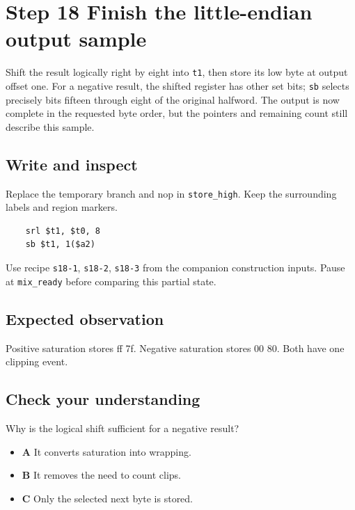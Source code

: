 \section{Step 18 Finish the little-endian output sample}\label{pcm-s18}

Shift the result logically right by eight into \texttt{t1}, then store its low byte at output offset one. For a negative result, the shifted register has other set bits; \texttt{sb} selects precisely bits fifteen through eight of the original halfword. The output is now complete in the requested byte order, but the pointers and remaining count still describe this sample.

\subsection{Write and inspect}
Replace the temporary branch and nop in \texttt{store\_high}. Keep the surrounding labels and region markers.

\begin{verbatim}
    srl $t1, $t0, 8
    sb $t1, 1($a2)
\end{verbatim}
Use recipe \texttt{s18-1}, \texttt{s18-2}, \texttt{s18-3} from the companion construction inputs. Pause at \texttt{mix\_ready} before comparing this partial state.

\subsection{Expected observation}
Positive saturation stores ff 7f. Negative saturation stores 00 80. Both have one clipping event.

\subsection{Check your understanding}
Why is the logical shift sufficient for a negative result?

\begin{itemize}
  \item \textbf{A} It converts saturation into wrapping.
  \item \textbf{B} It removes the need to count clips.
  \item \textbf{C} Only the selected next byte is stored.
\end{itemize}
